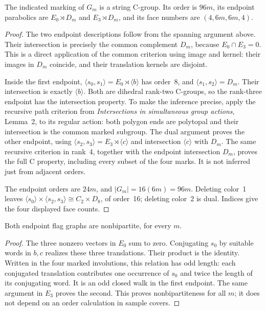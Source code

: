\documentclass[a4paper,11pt]{article}
\newcommand{\gen}[1]{\langle#1\rangle}\newcommand{\Aut}{\operatorname{Aut}}
\begin{document}
\begin{lemma}\label{ends}
The indicated marking of $G_m$ is a string C-group. Its order is $96m$,
its endpoint parabolics are $E_0\rtimes D_m$ and $E_3\rtimes D_m$, and
its face numbers are $(4,6m,6m,4)$.
\end{lemma}
\begin{proof}
The two endpoint descriptions follow from the spanning argument above.
Their intersection is precisely the common complement $D_m$, because
$E_0\cap E_3=0$. This is a direct application of the common criterion using image and
kernel: their images in $D_m$ coincide, and their translation
kernels are disjoint.

Inside the first endpoint, $\gen{s_0,s_1}=E_0\rtimes\gen{b}$ has order~8,
and $\gen{s_1,s_2}=D_m$. Their intersection is exactly $\gen{b}$.
Both are dihedral rank-two C-groups, so the rank-three endpoint has the
intersection property. To make the inference precise, apply the recursive
path criterion from \emph{Intersections in simultaneous group actions},
Lemma~2, to its regular action: both polygon ends are polytopal and their
intersection is the common marked subgroup. The dual argument proves
the other endpoint, using
$\gen{s_2,s_3}=E_3\rtimes\gen{c}$ and intersection $\gen{c}$ with $D_m$.
The same recursive criterion in rank~4, together with the endpoint
intersection $D_m$, proves the full C property, including every subset
of the four marks. It is not inferred just from adjacent orders.

The endpoint orders are $24m$, and $|G_m|=16(6m)=96m$.
Deleting color~1 leaves
$\gen{s_0}\times\gen{s_2,s_3}\cong C_2\times D_8$, of order~16;
deleting color~2 is dual. Indices give the four displayed face counts.
\end{proof}

\begin{lemma}\label{odd}
Both endpoint flag graphs are nonbipartite, for every $m$.
\end{lemma}
\begin{proof}
The three nonzero vectors in $E_0$ sum to zero. Conjugating $s_0$ by
suitable words in $b,c$ realizes these three translations. Their product
is the identity. Written in the four marked involutions, this relation
has odd length: each conjugated translation contributes one occurrence
of $s_0$ and twice the length of its conjugating word. It is an odd
closed walk in the first endpoint. The same argument in $E_3$ proves
the second. This proves nonbipartiteness for all $m$; it does not depend
on an order calculation in sample covers.
\end{proof}
\end{document}
